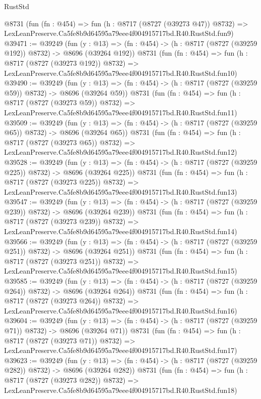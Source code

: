\begin{lexlean}{RustStd}
\begin{coremodule}
    @8731
    (fun (fn : @454) =>
    fun (h : @8717 (@8727 (@39273 @47)) @8732) =>
    LexLeanPreserve.Ca5fe8b9d64595a79eee4f004915717bd.R40.RustStd.fun9)
@39471 := @39249
    (fun (y : @13) => (fn : @454) -> (h : @8717 (@8727 (@39259 @192)) @8732) -> @8696 (@39264 @192))
    @8731
    (fun (fn : @454) =>
    fun (h : @8717 (@8727 (@39273 @192)) @8732) =>
    LexLeanPreserve.Ca5fe8b9d64595a79eee4f004915717bd.R40.RustStd.fun10)
@39490 := @39249
    (fun (y : @13) => (fn : @454) -> (h : @8717 (@8727 (@39259 @59)) @8732) -> @8696 (@39264 @59))
    @8731
    (fun (fn : @454) =>
    fun (h : @8717 (@8727 (@39273 @59)) @8732) =>
    LexLeanPreserve.Ca5fe8b9d64595a79eee4f004915717bd.R40.RustStd.fun11)
@39509 := @39249
    (fun (y : @13) => (fn : @454) -> (h : @8717 (@8727 (@39259 @65)) @8732) -> @8696 (@39264 @65))
    @8731
    (fun (fn : @454) =>
    fun (h : @8717 (@8727 (@39273 @65)) @8732) =>
    LexLeanPreserve.Ca5fe8b9d64595a79eee4f004915717bd.R40.RustStd.fun12)
@39528 := @39249
    (fun (y : @13) => (fn : @454) -> (h : @8717 (@8727 (@39259 @225)) @8732) -> @8696 (@39264 @225))
    @8731
    (fun (fn : @454) =>
    fun (h : @8717 (@8727 (@39273 @225)) @8732) =>
    LexLeanPreserve.Ca5fe8b9d64595a79eee4f004915717bd.R40.RustStd.fun13)
@39547 := @39249
    (fun (y : @13) => (fn : @454) -> (h : @8717 (@8727 (@39259 @239)) @8732) -> @8696 (@39264 @239))
    @8731
    (fun (fn : @454) =>
    fun (h : @8717 (@8727 (@39273 @239)) @8732) =>
    LexLeanPreserve.Ca5fe8b9d64595a79eee4f004915717bd.R40.RustStd.fun14)
@39566 := @39249
    (fun (y : @13) => (fn : @454) -> (h : @8717 (@8727 (@39259 @251)) @8732) -> @8696 (@39264 @251))
    @8731
    (fun (fn : @454) =>
    fun (h : @8717 (@8727 (@39273 @251)) @8732) =>
    LexLeanPreserve.Ca5fe8b9d64595a79eee4f004915717bd.R40.RustStd.fun15)
@39585 := @39249
    (fun (y : @13) => (fn : @454) -> (h : @8717 (@8727 (@39259 @264)) @8732) -> @8696 (@39264 @264))
    @8731
    (fun (fn : @454) =>
    fun (h : @8717 (@8727 (@39273 @264)) @8732) =>
    LexLeanPreserve.Ca5fe8b9d64595a79eee4f004915717bd.R40.RustStd.fun16)
@39604 := @39249
    (fun (y : @13) => (fn : @454) -> (h : @8717 (@8727 (@39259 @71)) @8732) -> @8696 (@39264 @71))
    @8731
    (fun (fn : @454) =>
    fun (h : @8717 (@8727 (@39273 @71)) @8732) =>
    LexLeanPreserve.Ca5fe8b9d64595a79eee4f004915717bd.R40.RustStd.fun17)
@39623 := @39249
    (fun (y : @13) => (fn : @454) -> (h : @8717 (@8727 (@39259 @282)) @8732) -> @8696 (@39264 @282))
    @8731
    (fun (fn : @454) =>
    fun (h : @8717 (@8727 (@39273 @282)) @8732) =>
    LexLeanPreserve.Ca5fe8b9d64595a79eee4f004915717bd.R40.RustStd.fun18)

\end{coremodule}
\end{lexlean}
